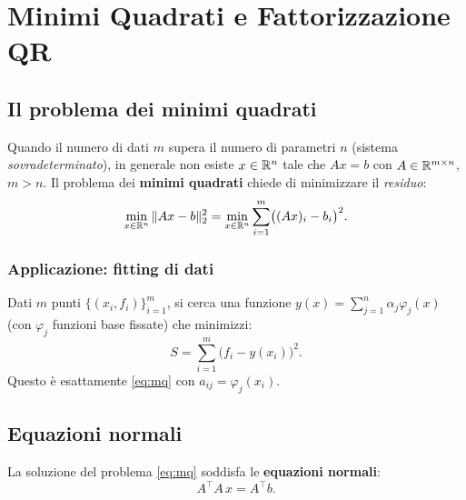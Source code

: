 \chapter{Minimi Quadrati e Fattorizzazione QR}
\label{ch:minimi_quadrati}

\section{Il problema dei minimi quadrati}
\label{sec:mq_problema}

Quando il numero di dati $m$ supera il numero di parametri $n$ (sistema
\emph{sovradeterminato}), in generale non esiste $x \in \mathbb{R}^n$ tale che $Ax = b$
con $A \in \mathbb{R}^{m \times n}$, $m > n$. Il problema dei \textbf{minimi quadrati}
chiede di minimizzare il \emph{residuo}:
\begin{equation}
  \min_{x \in \mathbb{R}^n} \|Ax - b\|_2^2 = \min_{x \in \mathbb{R}^n} \sum_{i=1}^m \bigl(
  (Ax)_i - b_i \bigr)^2.
  \label{eq:mq}
\end{equation}

\subsection{Applicazione: fitting di dati}

Dati $m$ punti $\{(x_i, f_i)\}_{i=1}^m$, si cerca una funzione
$y(x) = \sum_{j=1}^n \alpha_j \varphi_j(x)$ (con $\varphi_j$ funzioni base
fissate) che minimizzi:
\begin{equation}
  S = \sum_{i=1}^m \bigl(f_i - y(x_i)\bigr)^2.
  \label{eq:mq_fit}
\end{equation}
Questo è esattamente \cref{eq:mq} con $a_{ij} = \varphi_j(x_i)$.

\section{Equazioni normali}
\label{sec:equazioni_normali}

La soluzione del problema \cref{eq:mq} soddisfa le \textbf{equazioni normali}:
\begin{equation}
  A^\top A\, x = A^\top b.
  \label{eq:normali}
\end{equation}

